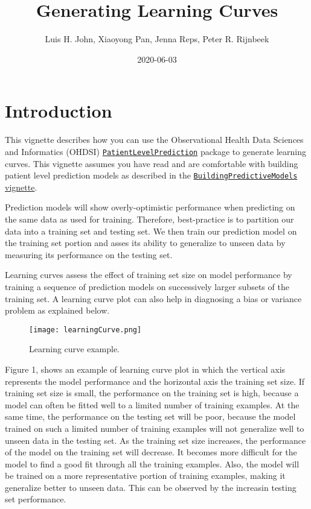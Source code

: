 \documentclass[
]{article}
\title{Generating Learning Curves}
\author{Luis H. John, Xiaoyong Pan, Jenna Reps, Peter R. Rijnbeek}
\date{2020-06-03}
\begin{document}
\maketitle

{
\setcounter{tocdepth}{2}
\tableofcontents
}
\hypertarget{introduction}{%
\section{Introduction}\label{introduction}}

This vignette describes how you can use the Observational Health Data
Sciences and Informatics (OHDSI)
\href{http://github.com/OHDSI/PatientLevelPrediction}{\texttt{PatientLevelPrediction}}
package to generate learning curves. This vignette assumes you have read
and are comfortable with building patient level prediction models as
described in the
\href{https://github.com/OHDSI/PatientLevelPrediction/blob/master/inst/doc/BuildingPredictiveModels.pdf}{\texttt{BuildingPredictiveModels}
vignette}.

Prediction models will show overly-optimistic performance when
predicting on the same data as used for training. Therefore,
best-practice is to partition our data into a training set and testing
set. We then train our prediction model on the training set portion and
asses its ability to generalize to unseen data by measuring its
performance on the testing set.

Learning curves assess the effect of training set size on model
performance by training a sequence of prediction models on successively
larger subsets of the training set. A learning curve plot can also help
in diagnosing a bias or variance problem as explained below.

\begin{figure}
\centering
\texttt{[image: learningCurve.png]}
\caption{Learning curve example.}
\end{figure}

Figure 1, shows an example of learning curve plot in which the vertical
axis represents the model performance and the horizontal axis the
training set size. If training set size is small, the performance on the
training set is high, because a model can often be fitted well to a
limited number of training examples. At the same time, the performance
on the testing set will be poor, because the model trained on such a
limited number of training examples will not generalize well to unseen
data in the testing set. As the training set size increases, the
performance of the model on the training set will decrease. It becomes
more difficult for the model to find a good fit through all the training
examples. Also, the model will be trained on a more representative
portion of training examples, making it generalize better to unseen
data. This can be observed by the increasin testing set performance.
\end{document}
